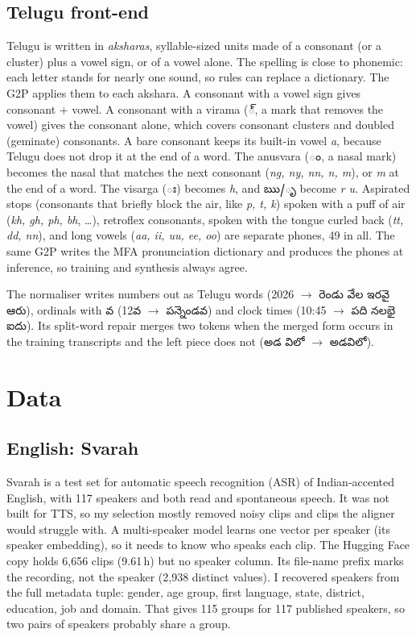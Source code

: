 \documentclass[11pt,a4paper]{article}
\newcommand{\tel}[1]{{\te #1}}
\begin{document}
\subsection{Telugu front-end}
\label{sec:te-frontend}
Telugu is written in \emph{aksharas}, syllable-sized units made of a consonant (or a cluster) plus a vowel sign,
or of a vowel alone. The spelling is close to phonemic: each letter stands for nearly one sound, so rules can
replace a dictionary. The G2P applies them to each akshara. A consonant with a vowel sign gives consonant + vowel. A
consonant with a virama (\tel{్}, a mark that removes the vowel) gives the consonant alone, which covers
consonant clusters and doubled (geminate) consonants. A bare consonant keeps its built-in vowel \emph{a}, because
Telugu does not drop it at the end of a word. The anusvara (\tel{ం}, a nasal mark) becomes the nasal that matches
the next consonant (\emph{ng, ny, nn, n, m}), or \emph{m} at the end of a word. The visarga (\tel{ః}) becomes
\emph{h}, and \tel{ఋ}/\tel{ృ} become \emph{r u}. Aspirated stops (consonants that briefly block the air, like
\emph{p, t, k}) spoken with a puff of air (\emph{kh, gh, ph, bh},
\ldots), retroflex consonants, spoken with the tongue curled back (\emph{tt, dd, nn}), and long vowels
(\emph{aa, ii, uu, ee, oo}) are separate phones, 49 in all. The same G2P writes the
MFA pronunciation dictionary and produces the phones at inference, so training and synthesis always agree.

The normaliser writes numbers out as Telugu words (2026 $\to$ \tel{రెండు వేల ఇరవై ఆరు}), ordinals with \tel{వ}
(\tel{12వ} $\to$ \tel{పన్నెండవ}) and clock times (10:45 $\to$ \tel{పది నలభై ఐదు}). Its split-word repair merges two
tokens when the merged form occurs in the training transcripts and the left piece does not
(\tel{అడ విలో} $\to$ \tel{అడవిలో}).

\section{Data}
\label{sec:data}
\subsection{English: Svarah}
Svarah is a test set for automatic speech recognition (ASR) of Indian-accented English, with 117 speakers and
both read and spontaneous speech. It was not built for TTS, so my selection mostly removed noisy clips and clips the
aligner would struggle with. A multi-speaker model learns one vector per speaker (its speaker embedding), so it
needs to know who speaks each clip. The Hugging Face copy holds 6,656 clips (9.61\,h) but no speaker column. Its file-name prefix marks the recording, not the speaker
(2,938 distinct values). I recovered speakers from the full metadata tuple: gender, age group, first language,
state, district, education, job and domain. That gives 115 groups for 117 published speakers, so two pairs of
speakers probably share a group.
\end{document}
